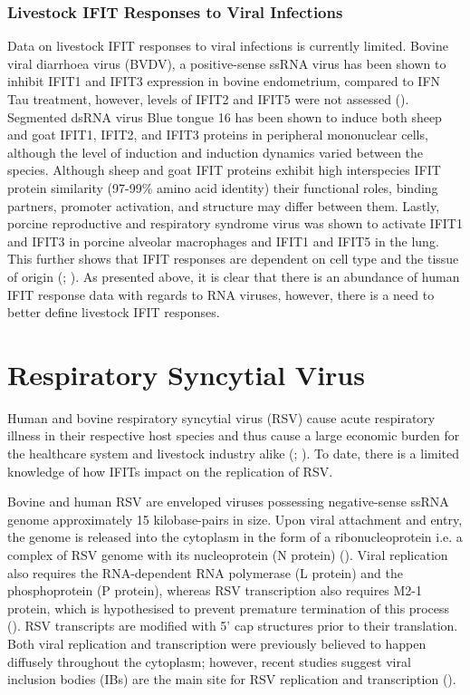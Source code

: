 \subsubsection{Livestock IFIT Responses to Viral Infections} \label{Livestock IFIT Responses to Viral Infections}
Data on livestock IFIT responses to viral infections is currently limited. Bovine viral diarrhoea virus (BVDV), a positive-sense ssRNA virus has been shown to inhibit IFIT1 and IFIT3 expression in bovine endometrium, compared to IFN Tau treatment, however, levels of IFIT2 and IFIT5 were not assessed (\cite{Cheng2017AcuteEndometrium}). Segmented dsRNA virus Blue tongue 16 has been shown to induce both sheep and goat IFIT1, IFIT2, and IFIT3 proteins in peripheral mononuclear cells, although the level of induction and induction dynamics varied between the species. Although sheep and goat IFIT proteins exhibit high interspecies IFIT protein similarity (97-99\% amino acid identity) their functional roles, binding partners, promoter activation, and structure may differ between them.  Lastly, porcine reproductive and respiratory syndrome virus was shown to activate IFIT1 and IFIT3 in porcine alveolar macrophages and IFIT1 and IFIT5 in the lung. This further shows that IFIT responses are dependent on cell type and the tissue of origin (\cite{Xiao2010AberrantProfiling}; \cite{Zhou2011MolecularVivo/i}). As presented above, it is clear that there is an abundance of human IFIT response data with regards to RNA viruses, however, there is a need to better define livestock IFIT responses.

\section{Respiratory Syncytial Virus} \label{sec:Respiratory Syncytial Virus}
Human and bovine respiratory syncytial virus (RSV) cause acute respiratory illness in their respective host species and thus cause a large economic burden for the healthcare system and livestock industry alike (\cite{Jha2016RespiratoryVirus}; \cite{Sacco2014RespiratoryCattle}). To date, there is a limited knowledge of how IFITs impact on the replication of RSV. 

Bovine and human RSV are enveloped viruses possessing negative-sense ssRNA genome approximately 15 kilobase-pairs in size. Upon viral attachment and entry, the genome is released into the cytoplasm in the form of a ribonucleoprotein i.e. a complex of RSV genome with its nucleoprotein (N protein) (\cite{Noton2015InitiationReplication}). Viral replication also requires the RNA-dependent RNA polymerase (L protein) and the phosphoprotein (P protein), whereas RSV transcription also requires M2-1 protein, which is hypothesised to prevent premature termination of this process (\cite{Tanner2014CrystalPhosphorylation}). RSV transcripts are modified with 5’ cap structures prior to their translation. Both viral replication and transcription were previously believed to happen diffusely throughout the cytoplasm; however, recent studies suggest viral inclusion bodies (IBs) are the main site for RSV replication and transcription (\cite{Rincheval2017FunctionalVirus}). 




